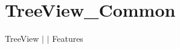 \chapter{Tree\+View\+\_\+\+Common }
\hypertarget{md__docs_2_common_2_features_2_tree_view___common}{}\label{md__docs_2_common_2_features_2_tree_view___common}
Tree\+View \texorpdfstring{$\vert$}{|}  \texorpdfstring{$\vert$}{|} Features



 